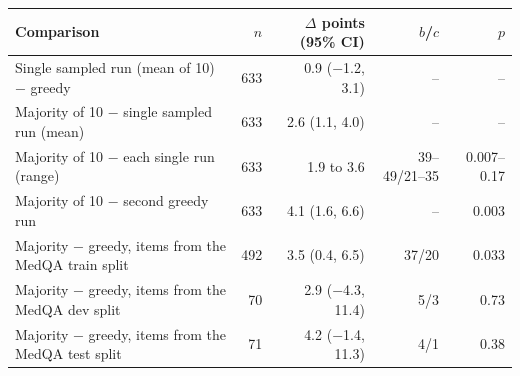 \begin{tabular}{@{}lrrrr@{}}
\toprule
Comparison & $n$ & $\Delta$ points (95\% CI) & $b$/$c$ & $p$ \\
\midrule
Single sampled run (mean of 10) $-$ greedy & 633 & 0.9 ($-$1.2, 3.1) & -- & -- \\
Majority of 10 $-$ single sampled run (mean) & 633 & 2.6 (1.1, 4.0) & -- & -- \\
Majority of 10 $-$ each single run (range) & 633 & 1.9 to 3.6 & 39--49/21--35 & 0.007--0.17 \\
Majority of 10 $-$ second greedy run & 633 & 4.1 (1.6, 6.6) & -- & 0.003 \\
\midrule
Majority $-$ greedy, items from the MedQA train split & 492 & 3.5 (0.4, 6.5) & 37/20 & 0.033 \\
Majority $-$ greedy, items from the MedQA dev split & 70 & 2.9 ($-$4.3, 11.4) & 5/3 & 0.73 \\
Majority $-$ greedy, items from the MedQA test split & 71 & 4.2 ($-$1.4, 11.3) & 4/1 & 0.38 \\
\bottomrule
\end{tabular}
